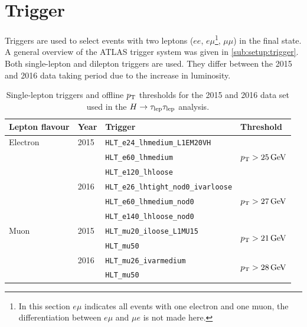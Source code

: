 \section{Trigger}\label{sec:event_selection:trigger}

Triggers are used to select events with two leptons ($ee$, $e\mu$\footnote{In this section $e\mu$ indicates all events
with one electron and one muon, the differentiation between $e\mu$ and $\mu e$ is not made here.}, $\mu\mu$) in the final state.
A general overview of the ATLAS trigger system was given in \cref{sub:setup:trigger}.
Both single-lepton and dilepton triggers are used.
They differ between the 2015 and 2016 data taking period due to the increase in luminosity.

\begin{table}[htpb]
    \centering
    \caption{Single-lepton triggers and offline $p_\text{T}$ thresholds for the 2015 and 2016 data set used in the $H \to \tau_\text{lep} \tau_\text{lep}$ analysis.}\label{tab:event_selection:trigger:single}
    \begin{tabular}{@{}llll@{}}
        \toprule
        Lepton flavour & Year & Trigger & Threshold \\ \midrule
        Electron       & 2015 & \texttt{HLT\_e24\_lhmedium\_L1EM20VH} & \multirow{3}{*}{$\pt > \unit[25]{GeV}$} \\
                       &      & \texttt{HLT\_e60\_lhmedium} \\
                       &      & \texttt{HLT\_e120\_lhloose} \\ \cmidrule(l){2-4}
                       & 2016 & \texttt{HLT\_e26\_lhtight\_nod0\_ivarloose} & \multirow{3}{*}{$\pt > \unit[27]{GeV}$} \\
                       &      & \texttt{HLT\_e60\_lhmedium\_nod0} \\
                       &      & \texttt{HLT\_e140\_lhloose\_nod0} \\ \midrule
        Muon           & 2015 & \texttt{HLT\_mu20\_iloose\_L1MU15} & \multirow{2}{*}{$\pt > \unit[21]{GeV}$} \\
                       &      & \texttt{HLT\_mu50} \\ \cmidrule(l){2-4}
                       & 2016 & \texttt{HLT\_mu26\_ivarmedium} & \multirow{2}{*}{$\pt > \unit[28]{GeV}$} \\
                       &      & \texttt{HLT\_mu50} \\
        \bottomrule
    \end{tabular}
\end{table}

